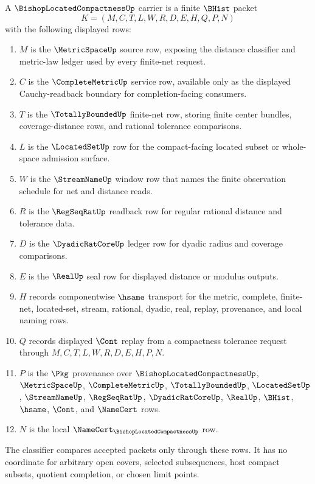 \begin{definition}
\label{def:bishop-located-compactness-carrier}
A $\BishopLocatedCompactnessUp$ carrier is a finite $\BHist$ packet
$$
K=(M,C,T,L,W,R,D,E,H,Q,P,N)
$$
with the following displayed rows:
\begin{enumerate}
\item $M$ is the $\MetricSpaceUp$ source row, exposing the distance classifier and metric-law ledger used by every finite-net request.
\item $C$ is the $\CompleteMetricUp$ service row, available only as the displayed Cauchy-readback boundary for completion-facing consumers.
\item $T$ is the $\TotallyBoundedUp$ finite-net row, storing finite center bundles, coverage-distance rows, and rational tolerance comparisons.
\item $L$ is the $\LocatedSetUp$ row for the compact-facing located subset or whole-space admission surface.
\item $W$ is the $\StreamNameUp$ window row that names the finite observation schedule for net and distance reads.
\item $R$ is the $\RegSeqRatUp$ readback row for regular rational distance and tolerance data.
\item $D$ is the $\DyadicRatCoreUp$ ledger row for dyadic radius and coverage comparisons.
\item $E$ is the $\RealUp$ seal row for displayed distance or modulus outputs.
\item $H$ records componentwise $\hsame$ transport for the metric, complete, finite-net, located-set, stream, rational, dyadic, real, replay, provenance, and local naming rows.
\item $Q$ records displayed $\Cont$ replay from a compactness tolerance request through $M,C,T,L,W,R,D,E,H,P,N$.
\item $P$ is the $\Pkg$ provenance over $\BishopLocatedCompactnessUp$, $\MetricSpaceUp$, $\CompleteMetricUp$, $\TotallyBoundedUp$, $\LocatedSetUp$, $\StreamNameUp$, $\RegSeqRatUp$, $\DyadicRatCoreUp$, $\RealUp$, $\BHist$, $\hsame$, $\Cont$, and $\NameCert$ rows.
\item $N$ is the local $\NameCert_{\BishopLocatedCompactnessUp}$ row.
\end{enumerate}
The classifier compares accepted packets only through these rows. It has no coordinate for arbitrary open covers, selected subsequences, host compact subsets, quotient completion, or chosen limit points.
\end{definition}

